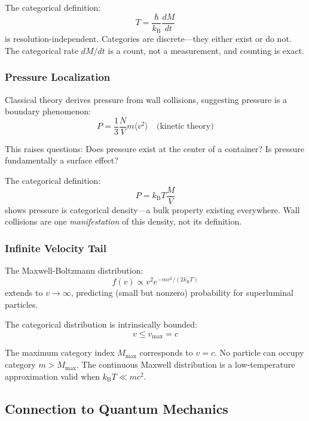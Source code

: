\documentclass[twocolumn,10pt]{article}
\theoremstyle{definition}
\theoremstyle{remark}
\newcommand{\kB}{k_{\mathrm{B}}}
\begin{document}
The categorical definition:
\begin{equation}
T = \frac{\hbar}{\kB}\frac{dM}{dt}
\end{equation}
is resolution-independent. Categories are discrete---they either exist or do not. The categorical rate $dM/dt$ is a count, not a measurement, and counting is exact.

\subsubsection{Pressure Localization}

Classical theory derives pressure from wall collisions, suggesting pressure is a boundary phenomenon:
\begin{equation}
P = \frac{1}{3}\frac{N}{V}m\langle v^2\rangle \quad \text{(kinetic theory)}
\end{equation}

This raises questions: Does pressure exist at the center of a container? Is pressure fundamentally a surface effect?

The categorical definition:
\begin{equation}
P = \kB T \frac{M}{V}
\end{equation}
shows pressure is categorical density---a bulk property existing everywhere. Wall collisions are one \textit{manifestation} of this density, not its definition.

\subsubsection{Infinite Velocity Tail}

The Maxwell-Boltzmann distribution:
\begin{equation}
f(v) \propto v^2 e^{-mv^2/(2\kB T)}
\end{equation}
extends to $v \to \infty$, predicting (small but nonzero) probability for superluminal particles.

The categorical distribution is intrinsically bounded:
\begin{equation}
v \leq v_{\max} = c
\end{equation}

The maximum category index $M_{\max}$ corresponds to $v = c$. No particle can occupy category $m > M_{\max}$. The continuous Maxwell distribution is a low-temperature approximation valid when $\kB T \ll mc^2$.

\subsection{Connection to Quantum Mechanics}
\end{document}
